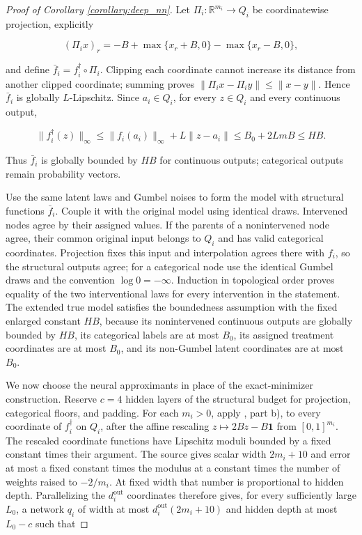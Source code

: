 \begin{proof}[Proof of Corollary \ref{corollary:deep_nn}]
Let $\Pi_i:\mathbb R^{m_i}\to Q_i$ be coordinatewise projection, explicitly

\[
(\Pi_i x)_r=-B+\max\{x_r+B,0\}-\max\{x_r-B,0\},
\]

and define $\bar f_i=f_i^\dagger\circ\Pi_i$. Clipping each coordinate cannot increase its distance from another clipped coordinate; summing proves $\|\Pi_i x-\Pi_i y\|\leqslant\|x-y\|$. Hence $\bar f_i$ is globally $L$-Lipschitz. Since $a_i\in Q_i$, for every $z\in Q_i$ and every continuous output,

\[
\|f_i^\dagger(z)\|_\infty\leqslant\|f_i(a_i)\|_\infty+L\|z-a_i\|\leqslant B_0+2LmB\leqslant HB.
\]

Thus $\bar f_i$ is globally bounded by $HB$ for continuous outputs; categorical outputs remain probability vectors. 

Use the same latent laws and Gumbel noises to form the model with structural functions $\bar f_i$. Couple it with the original model using identical draws. Intervened nodes agree by their assigned values. If the parents of a nonintervened node agree, their common original input belongs to $Q_i$ and has valid categorical coordinates. Projection fixes this input and interpolation agrees there with $f_i$, so the structural outputs agree; for a categorical node use the identical Gumbel draws and the convention $\log0=-\infty$. Induction in topological order proves equality of the two interventional laws for every intervention in the statement. The extended true model satisfies the boundedness assumption with the fixed enlarged constant $HB$, because its nonintervened continuous outputs are globally bounded by $HB$, its categorical labels are at most $B_0$, its assigned treatment coordinates are at most $B_0$, and its non-Gumbel latent coordinates are at most $B_0$. 

We now choose the neural approximants in place of the exact-minimizer construction. Reserve $c=4$ hidden layers of the structural budget for projection, categorical floors, and padding. For each $m_i>0$, apply \cite[Theorem 2]{Yarotsky2018OptimalAO}, part b), to every coordinate of $f_i^\dagger$ on $Q_i$, after the affine rescaling $z\mapsto2Bz-B\boldsymbol 1$ from $[0,1]^{m_i}$. The rescaled coordinate functions have Lipschitz moduli bounded by a fixed constant times their argument. The source gives scalar width $2m_i+10$ and error at most a fixed constant times the modulus at a constant times the number of weights raised to $-2/m_i$. At fixed width that number is proportional to hidden depth. Parallelizing the $d_i^{\text{out}}$ coordinates therefore gives, for every sufficiently large $L_0$, a network $q_i$ of width at most $d_i^{\text{out}}(2m_i+10)$ and hidden depth at most $L_0-c$ such that


\end{proof}
